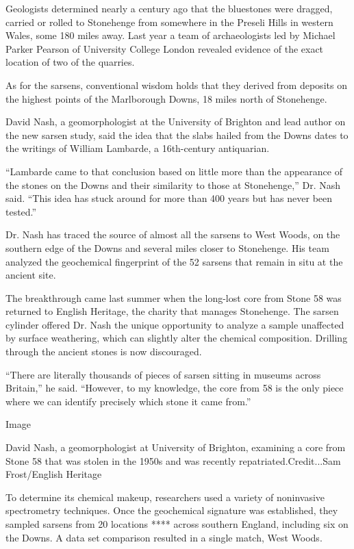 Geologists determined nearly a century ago that the bluestones were
dragged, carried or rolled to Stonehenge from somewhere in the Preseli
Hills in western Wales, some 180 miles away. Last year a team of
archaeologists led by Michael Parker Pearson of University College
London revealed evidence of the exact location of two of the quarries.

As for the sarsens, conventional wisdom holds that they derived from
deposits on the highest points of the Marlborough Downs, 18 miles north
of Stonehenge.

David Nash, a geomorphologist at the University of Brighton and lead
author on the new sarsen study, said the idea that the slabs hailed from
the Downs dates to the writings of William Lambarde, a 16th-century
antiquarian.

``Lambarde came to that conclusion based on little more than the
appearance of the stones on the Downs and their similarity to those at
Stonehenge,'' Dr. Nash said. ``This idea has stuck around for more than
400 years but has never been tested.''

Dr. Nash has traced the source of almost all the sarsens to West Woods,
on the southern edge of the Downs and several miles closer to
Stonehenge. His team analyzed the geochemical fingerprint of the 52
sarsens that remain in situ at the ancient site.

The breakthrough came last summer when the long-lost core from Stone 58
was returned to English Heritage, the charity that manages Stonehenge.
The sarsen cylinder offered Dr. Nash the unique opportunity to analyze a
sample unaffected by surface weathering, which can slightly alter the
chemical composition. Drilling through the ancient stones is now
discouraged.

``There are literally thousands of pieces of sarsen sitting in museums
across Britain,'' he said. ``However, to my knowledge, the core from 58
is the only piece where we can identify precisely which stone it came
from.''

Image

David Nash, a geomorphologist at University of Brighton, examining a
core from Stone 58 that was stolen in the 1950s and was recently
repatriated.Credit...Sam Frost/English Heritage

To determine its chemical makeup, researchers used a variety of
noninvasive spectrometry techniques. Once the geochemical signature was
established, they sampled sarsens from 20 locations **** across southern
England, including six on the Downs. A data set comparison resulted in a
single match, West Woods.

